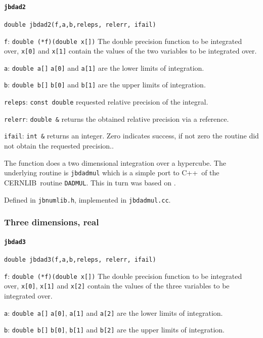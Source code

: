\documentclass[12pt,a4paper]{article}
\newcommand{\mytt}[1]{\texttt{#1}}
\newcommand{\newfunction}[1]{\mytt{#1}\index{\mytt{#1}}}
\newcommand{\cernlib}{\textsc{CERNLIB}\cite{cernlib}}
\newcommand{\cpp}{\textsc{C++}}
\begin{document}
\paragraph{\newfunction{jbdad2}}

\mytt{double jbdad2(f,a,b,releps, relerr, ifail)}

\mytt{f}: \mytt{double (*f)(double x[])} The double precision
function to be integrated over, \mytt{x[0]} and \mytt{x[1]} contain
the values of the two variables to be integrated over.


\mytt{a}: \mytt{double a[]}  \mytt{a[0]} and \mytt{a[1]} are the lower limits of integration.

\mytt{b}: \mytt{double b[]}  \mytt{b[0]} and \mytt{b[1]} are the upper limits of integration.

\mytt{releps}: \mytt{const double} requested relative precision of the integral.

\mytt{relerr}: \mytt{double \&} returns the obtained relative precision
via a reference.

\mytt{ifail}: \mytt{int \&} returns an integer. Zero indicates success,
if not zero the routine did not obtain the requested precision..

The function does a two dimensional integration over a hypercube.
The underlying routine is \mytt{jbdadmul} which is
a simple port to \cpp\ of the \cernlib\ routine
 \mytt{DADMUL}. This in turn was based on \cite{radmulpaper}.

Defined in \mytt{jbnumlib.h}, implemented in \mytt{jbdadmul.cc}.

\subsubsection{Three dimensions, real}
\paragraph{\newfunction{jbdad3}}

\mytt{double jbdad3(f,a,b,releps, relerr, ifail)}

\mytt{f}: \mytt{double (*f)(double x[])} The double precision
function to be integrated over, \mytt{x[0]}, \mytt{x[1]} and  \mytt{x[2]}
contain the values of the three variables to be integrated over.

\mytt{a}: \mytt{double a[]}  \mytt{a[0]}, \mytt{a[1]} and \mytt{a[2]} are the lower limits of integration.

\mytt{b}: \mytt{double b[]}  \mytt{b[0]}, \mytt{b[1]} and \mytt{b[2]} are the upper limits of integration.
\end{document}
